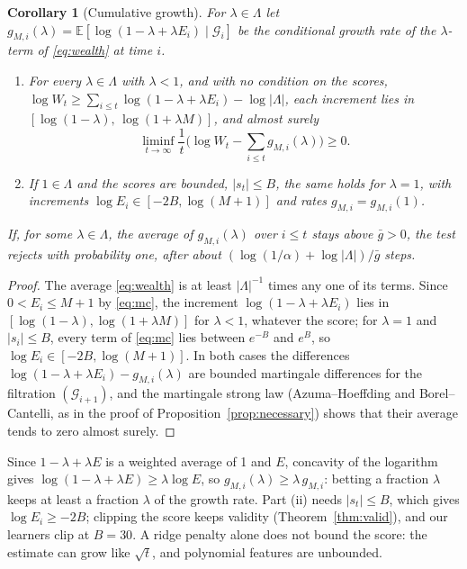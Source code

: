 \documentclass[12pt]{article}
\newcommand{\E}{\mathbb{E}}
\newcommand{\G}{\mathcal{G}}
\newtheorem{corollary}{Corollary}
\theoremstyle{remark}
\begin{document}
\begin{corollary}[Cumulative growth]\label{cor:cumulative}
For $\lambda \in \Lambda$ let
$g_{M,i}(\lambda) = \E[\log(1 - \lambda + \lambda E_i) \mid \G_i]$ be the
conditional growth rate of the $\lambda$-term of \eqref{eq:wealth} at time $i$.
\begin{enumerate}
\item[(i)] For every $\lambda \in \Lambda$ with $\lambda < 1$, and with no
condition on the scores,
$\log W_t \ge \sum_{i \le t} \log(1 - \lambda + \lambda E_i) - \log|\Lambda|$,
each increment lies in $[\log(1-\lambda),\, \log(1 + \lambda M)]$, and almost
surely
\[
\liminf_{t \to \infty} \frac1t \Big(\log W_t - \sum_{i \le t} g_{M,i}(\lambda)\Big) \ge 0 .
\]
\item[(ii)] If $1 \in \Lambda$ and the scores are bounded, $|s_t| \le B$, the
same holds for $\lambda = 1$, with increments $\log E_i \in [-2B, \log(M+1)]$
and rates $g_{M,i} = g_{M,i}(1)$.
\end{enumerate}
If, for some $\lambda \in \Lambda$, the average of $g_{M,i}(\lambda)$ over
$i \le t$ stays above $\bar g > 0$, the test rejects with probability one,
after about $(\log(1/\alpha) + \log|\Lambda|)/\bar g$ steps.
\end{corollary}

\begin{proof}
The average \eqref{eq:wealth} is at least $|\Lambda|^{-1}$ times any one of its
terms. Since $0 < E_i \le M+1$ by \eqref{eq:mc}, the increment
$\log(1 - \lambda + \lambda E_i)$ lies in $[\log(1-\lambda), \log(1+\lambda M)]$
for $\lambda < 1$, whatever the score; for $\lambda = 1$ and $|s_i| \le B$,
every term of \eqref{eq:mc} lies between $e^{-B}$ and $e^{B}$, so
$\log E_i \in [-2B, \log(M+1)]$. In both cases the differences
$\log(1 - \lambda + \lambda E_i) - g_{M,i}(\lambda)$ are bounded martingale
differences for the filtration $(\G_{i+1})$, and the martingale strong law
(Azuma--Hoeffding and Borel--Cantelli, as in the proof of
Proposition~\ref{prop:necessary}) shows that their average tends to zero
almost surely.
\end{proof}

 Since $1-\lambda+\lambda E$ is a weighted average of 1
and $E$, concavity of the logarithm gives $\log(1-\lambda+\lambda E) \ge \lambda\log E$,
so $g_{M,i}(\lambda) \ge \lambda\, g_{M,i}$: betting a fraction $\lambda$ keeps
at least a fraction $\lambda$ of the growth rate. Part (ii) needs
$|s_t| \le B$, which gives $\log E_i \ge -2B$; clipping the score keeps
validity (Theorem~\ref{thm:valid}), and our learners clip at $B = 30$. A ridge
penalty alone does not bound the score: the estimate can grow like
$\sqrt t$, and polynomial features are unbounded.
\end{document}
